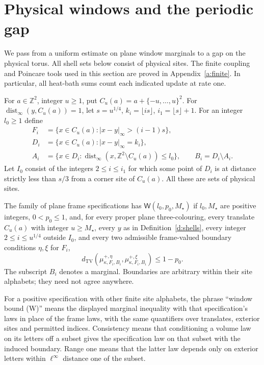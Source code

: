 \section{Physical windows and the periodic gap}
\label{s:periodic-gap}

We pass from a uniform estimate on plane window marginals to a gap on
the physical torus.  All shell sets below consist of physical sites.
The finite coupling and Poincare tools used in this section are proved
in Appendix~\ref{a:finite}.  In particular, all heat-bath sums count
each indicated update at rate one.

\begin{definition}\label{d:shells}
For \(a\in\mathbb Z^2\), integer \(u\ge1\), put
\(C_u(a)=a+\{-u,\ldots,u\}^2\).
For \(\operatorname{dist}_\infty(y,C_u(a))=1\), let
\(s=u^{1/4}\), \(k_i=\lfloor is\rfloor\), \(i_1=\lfloor s\rfloor+1\).
For an integer \(l_0\ge1\) define
\[
 \begin{split}
 F_i&=\{x\in C_u(a):|x-y|_\infty>(i-1)s\},\\
 D_i&=\{x\in C_u(a):|x-y|_\infty=k_i\},\\
 A_i&=\{x\in D_i:\operatorname{dist}_\infty
                    (x,\mathbb Z^2\setminus C_u(a))\le l_0\},\qquad
 B_i=D_i\setminus A_i .
 \end{split}
\]
Let \(I_0\) consist of the integers \(2\le i\le i_1\) for which
some point of \(D_i\) is at distance strictly less than \(s/3\)
from a corner site of \(C_u(a)\).
All these are sets of physical sites.
\end{definition}

\begin{definition}[(W)]\label{d:W}
The family of plane frame specifications has \(\mathsf W(l_0,p_0,M_\star)\)
if \(l_0,M_\star\) are positive integers, \(0<p_0\le1\), and,
for every proper plane three-colouring, every translate \(C_u(a)\)
with integer \(u\ge M_\star\), every \(y\) as in Definition~\ref{d:shells},
every integer \(2\le i\le u^{1/4}\) outside \(I_0\), and every two
admissible frame-valued boundary conditions \(\eta,\xi\) for \(F_i\),
\[
 d_{\mathrm{TV}}\!\left(
       \mu^{+,\eta}_{\kappa,F_i,B_i},
       \mu^{+,\xi}_{\kappa,F_i,B_i}\right)\le1-p_0 .
\]
The subscript \(B_i\) denotes a marginal. Boundaries are arbitrary
within their site alphabets; they need not agree anywhere.
\end{definition}

For a positive specification with other finite site alphabets, the
phrase ``window bound (W)'' means the displayed marginal inequality
with that specification's laws in place of the frame laws, with the
same quantifiers over translates, exterior sites and permitted indices.
Consistency means that conditioning a volume law on its letters off a
subset gives the specification law on that subset with the induced
boundary.  Range one means that the latter law depends only on exterior
letters within \(\ell^\infty\) distance one of the subset.

